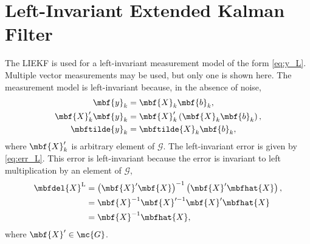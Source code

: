 \section{Left-Invariant Extended Kalman Filter}
\label{sec:LIEFK}
The LIEKF is used for a left-invariant measurement model of the form \eqref{eq:y_L}. Multiple vector measurements may be used, but only one is shown here. The measurement model is left-invariant because, in the absence of noise, 
\begin{align*}
	\mbf{y}_k & = \mbf{X}_k\mbf{b}_k, \\
	\mbf{X}_{k}'\mbf{y}_k &  = \mbf{X}_{k}'\left(\mbf{X}_k \mbf{b}_k \right), \\
	\mbftilde{y}_k & = \mbftilde{X}_k\mbf{b}_k,
\end{align*}
where $\mbf{X}_{k}'$ is arbitrary element of $\mathcal{G}$. The left-invariant error is given by \eqref{eq:err_L}. This error is left-invariant because the error is invariant to left multiplication by an element of $\mathcal{G}$,
\begin{align*}
	\mbfdel{X}^\mathrm{L} & = \left(\mbf{X}'\mbf{X}\right)^{-1} \left(\mbf{X}'\mbfhat{X}\right), \\
	& = \mbf{X}^{-1}\mbf{X}'^{-1} \mbf{X}'\mbfhat{X} \\
	& = \mbf{X}^{-1} \mbfhat{X},
\end{align*}
where $\mbf{X}' \in \mc{G}$.

